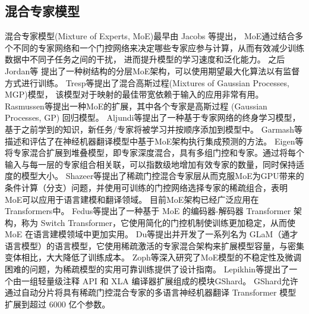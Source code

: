 \subsection{混合专家模型}

混合专家模型(Mixture of Experts, MoE)最早由 Jacobs 等\cite{jacobs1991adaptive}提出，
MoE通过结合多个不同的专家网络和一个门控网络来决定哪些专家应参与计算，从而有效减少训练数据中不同子任务之间的干扰，
进而提升模型的学习速度和泛化能力。
之后Jordan等\cite{jordan1994hierarchical}
提出了一种树结构的分层MoE架构，可以使用期望最大化算法以有监督方式进行训练。
Tresp等\cite{tresp2001mixtures}提出了混合高斯过程(Mixtures of Gaussian Processes, MGP)模型，
该模型对于映射的最佳带宽依赖于输入的应用非常有用。
Rasmussen等\cite{rasmussen2001infinite}提出一种MoE的扩展，其中各个专家是高斯过程 (Gaussian Processes, GP) 回归模型。
Aljundi等\cite{aljundi2017expert}提出了一种基于专家网络的终身学习模型，基于之前学到的知识，新任务/专家将被学习并按顺序添加到模型中。
Garmash等\cite{garmash2016ensemble}描述和评估了在神经机器翻译模型中基于MoE架构执行集成预测的方法。
Eigen等\cite{eigen2013learning}将专家混合扩展到堆叠模型，即专家深度混合，具有多组门控和专家。通过将每个输入与每一层的专家组合相关联，可以指数级地增加有效专家的数量，同时保持适度的模型大小。
Shazeer等\cite{shazeer2017outrageously}提出了稀疏门控混合专家层从而克服MoE为GPU带来的条件计算（分支）问题，并使用可训练的门控网络选择专家的稀疏组合，表明MoE可以应用于语言建模和翻译领域。
目前MoE架构已经广泛应用在Transformers\cite{vaswani2017attention}中。
Fedus等\cite{fedus2022switch}提出了一种基于 MoE 的编码器-解码器 Transformer 架构，称为 Switch Transformer，它使用简化的门控机制使训练更加稳定，从而使 MoE 在语言建模领域中更加实用。
Du等\cite{du2022glam}提出并开发了一系列名为 GLaM（通才语言模型）的语言模型，它使用稀疏激活的专家混合架构来扩展模型容量，与密集变体相比，大大降低了训练成本。
Zoph等\cite{zoph2022st}深入研究了MoE模型的不稳定性及微调困难的问题，为稀疏模型的实用可靠训练提供了设计指南。
Lepikhin等\cite{lepikhin2020gshard}提出了一个由一组轻量级注释 API 和 XLA 编译器扩展组成的模块GShard。 GShard允许通过自动分片将具有稀疏门控混合专家的多语言神经机器翻译 Transformer 模型扩展到超过 6000 亿个参数。

